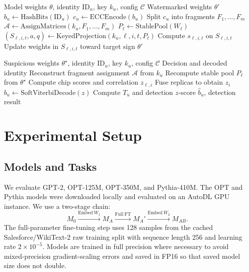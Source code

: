\documentclass[sigconf]{acmart}
\newcommand{\method}{ChainMark}
\begin{document}
\begin{algorithm}[t]
\caption{\method{} embedding}
\label{alg:embed}
\begin{algorithmic}[1]
\Require Model weights $\theta$, identity $\mathrm{ID}_u$, key $k_u$, config $\mathcal{C}$
\Ensure Watermarked weights $\theta'$
\State $b_u \gets \mathrm{HashBits}(\mathrm{ID}_u)$
\State $c_u \gets \mathrm{ECCEncode}(b_u)$
\State Split $c_u$ into fragments $F_1,\ldots,F_m$
\State $\mathcal{A}\gets \mathrm{AssignMatrices}(k_u,F_1,\ldots,F_m)$
    \State $P_\ell\gets \mathrm{StablePool}(W_\ell)$
            \State $(S_{\ell,i,t},a,q)\gets \mathrm{KeyedProjection}(k_u,\ell,i,t,P_\ell)$
            \State Compute $s_{\ell,i,t}$ on $S_{\ell,i,t}$
                \State Update weights in $S_{\ell,i,t}$ toward target sign
            \EndIf
        \EndFor
    \EndFor
\EndFor
\State \Return $\theta'$
\end{algorithmic}
\end{algorithm}

\begin{algorithm}[t]
\caption{\method{} extraction}
\label{alg:extract}
\begin{algorithmic}[1]
\Require Suspicious weights $\theta^\star$, identity $\mathrm{ID}_u$, key $k_u$, config $\mathcal{C}$
\Ensure Decision and decoded identity
\State Reconstruct fragment assignment $\mathcal{A}$ from $k_u$
        \State Recompute stable pool $P_\ell$ from $\theta^\star$
        \State Compute chip scores and correlation $z_{\ell,i}$
    \EndFor
    \State Fuse replicas to obtain $z_i$
\EndFor
\State $\hat{b}_u\gets \mathrm{SoftViterbiDecode}(z)$
\State Compute $T_u$ and detection $z$-score
\State \Return $\hat{b}_u$, detection result
\end{algorithmic}
\end{algorithm}

\section{Experimental Setup}

\subsection{Models and Tasks}
We evaluate GPT-2, OPT-125M, OPT-350M, and Pythia-410M. The OPT and Pythia models were downloaded locally and evaluated on an AutoDL GPU instance. We use a two-stage chain:
\begin{equation}
M_0 \xrightarrow{\mathrm{Embed}\ W_1} M_A
\xrightarrow{\mathrm{Full\ FT}} M_A'
\xrightarrow{\mathrm{Embed}\ W_2} M_{AB}.
\end{equation}
The full-parameter fine-tuning step uses 128 samples from the cached Salesforce/WikiText-2 raw training split with sequence length 256 and learning rate $2\times 10^{-5}$. Models are trained in full precision where necessary to avoid mixed-precision gradient-scaling errors and saved in FP16 so that saved model size does not double.
\end{document}

